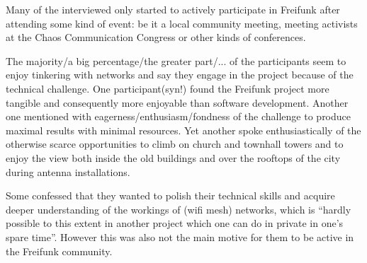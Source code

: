 Many of the interviewed only started to actively participate in Freifunk after attending some kind of event: be it a local community meeting, meeting activists at the Chaos Communication Congress or other kinds of conferences.

\begin{comment}
# Was ist am Projekt nicht so cool?

### Kommunikations/Diskussionskultur

* "Kommunikationskultur"
* "Arbeit im Team ist manchmal schwierig"
* "wenn Leute meinen, den richtigen Weg gefunden zu haben und den anderen aufzuzwingen und alles an sich reißen"
* "wenn sich Menschen richtig bekämpfen, hat das das Potenzial auch das Gesamtprojekt richtig runter zu ziehen"
* "treffen, die man viel redet und nichts passiert sind auch lästig"
* "leute, die in die presse sich als organisator_innen ausgeben und nur auf dem ruhm aus sind; trotzdem ist auch wichtig, dass jemand mit der presse und mit der stadt redet"

---

### Gender

* "genderthemen: community besteht größtenteils aus männern, die zu öffnen/erweiter funktioniert bis jetzt nicht so gut"

---


\end{comment}

The majority/a big percentage/the greater part/... of the participants seem to enjoy tinkering with networks and say they engage in the project because of the technical challenge.
One participant(syn!) found the Freifunk project more tangible and consequently more enjoyable than software development.
Another one mentioned with eagerness/enthusiasm/fondness of the challenge to produce maximal results with minimal resources.
Yet another spoke enthusiastically of the otherwise scarce opportunities to climb on church and townhall towers and to enjoy the view both inside the old buildings and over the rooftops of the city during antenna installations.

Some confessed that they wanted to polish their technical skills and acquire deeper understanding of the workings of (wifi mesh) networks, which is ``hardly possible to this extent in another project which one can do in private in one's spare time''.
However this was also not the main motive for them to be active in the Freifunk community.

